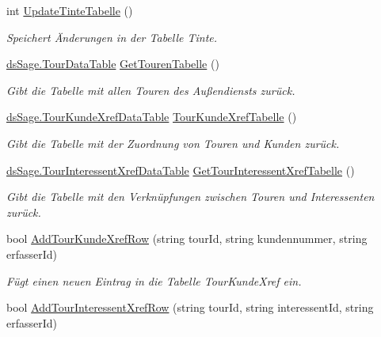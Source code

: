 \begin{DoxyCompactItemize}
\item 
int \hyperlink{class_products_1_1_data_1_1_data_service_aeb25cd62a6fddcd7362721e241ef0a2f}{Update\+Tinte\+Tabelle} ()
\begin{DoxyCompactList}\small\item\em Speichert Änderungen in der Tabelle Tinte. \end{DoxyCompactList}\item 
\hyperlink{class_products_1_1_data_1_1ds_sage_1_1_tour_data_table}{ds\+Sage.\+Tour\+Data\+Table} \hyperlink{class_products_1_1_data_1_1_data_service_a99dc06ecc5efd4b6645e73505cb7074c}{Get\+Touren\+Tabelle} ()
\begin{DoxyCompactList}\small\item\em Gibt die Tabelle mit allen Touren des Außendiensts zurück. \end{DoxyCompactList}\item 
\hyperlink{class_products_1_1_data_1_1ds_sage_1_1_tour_kunde_xref_data_table}{ds\+Sage.\+Tour\+Kunde\+Xref\+Data\+Table} \hyperlink{class_products_1_1_data_1_1_data_service_adb207f0ca67966101e5a418f8c68dd61}{Tour\+Kunde\+Xref\+Tabelle} ()
\begin{DoxyCompactList}\small\item\em Gibt die Tabelle mit der Zuordnung von Touren und Kunden zurück. \end{DoxyCompactList}\item 
\hyperlink{class_products_1_1_data_1_1ds_sage_1_1_tour_interessent_xref_data_table}{ds\+Sage.\+Tour\+Interessent\+Xref\+Data\+Table} \hyperlink{class_products_1_1_data_1_1_data_service_a17cc5307d64e29a21f8ab5b201023c69}{Get\+Tour\+Interessent\+Xref\+Tabelle} ()
\begin{DoxyCompactList}\small\item\em Gibt die Tabelle mit den Verknüpfungen zwischen Touren und Interessenten zurück. \end{DoxyCompactList}\item 
bool \hyperlink{class_products_1_1_data_1_1_data_service_a17d18987e5839f3c7971765ce0d12969}{Add\+Tour\+Kunde\+Xref\+Row} (string tour\+Id, string kundennummer, string erfasser\+Id)
\begin{DoxyCompactList}\small\item\em Fügt einen neuen Eintrag in die Tabelle Tour\+Kunde\+Xref ein. \end{DoxyCompactList}\item 
bool \hyperlink{class_products_1_1_data_1_1_data_service_a014c7dba039c4280c89d9af69b1cc59f}{Add\+Tour\+Interessent\+Xref\+Row} (string tour\+Id, string interessent\+Id, string erfasser\+Id)

\end{DoxyCompactItemize}
